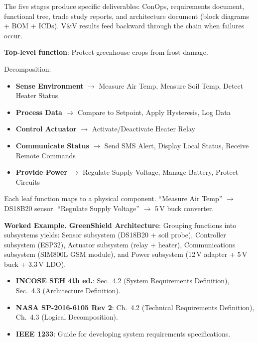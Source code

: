 The five stages produce specific deliverables: ConOps, requirements document, functional tree, trade study reports, and architecture document (block diagrams + BOM + ICDs). V\&V results feed backward through the chain when failures occur.


\begin{greenshieldbox}
\textbf{Top-level function}: Protect greenhouse crops from frost damage.

Decomposition:
\begin{itemize}[nosep,leftmargin=1.5em]
\item \textbf{Sense Environment} $\to$ Measure Air Temp, Measure Soil Temp, Detect Heater Status
\item \textbf{Process Data} $\to$ Compare to Setpoint, Apply Hysteresis, Log Data
\item \textbf{Control Actuator} $\to$ Activate/Deactivate Heater Relay
\item \textbf{Communicate Status} $\to$ Send SMS Alert, Display Local Status, Receive Remote Commands
\item \textbf{Provide Power} $\to$ Regulate Supply Voltage, Manage Battery, Protect Circuits
\end{itemize}
Each leaf function maps to a physical component. ``Measure Air Temp'' $\to$ DS18B20 sensor. ``Regulate Supply Voltage'' $\to$ 5\,V buck converter.

\textbf{Worked Example. GreenShield Architecture}: Grouping functions into subsystems yields: Sensor subsystem (DS18B20 + soil probe), Controller subsystem (ESP32), Actuator subsystem (relay + heater), Communications subsystem (SIM800L GSM module), and Power subsystem (12\,V adapter + 5\,V buck + 3.3\,V LDO).
\end{greenshieldbox}

\begin{keyconceptbox}
\begin{itemize}[nosep,leftmargin=1.5em]
\item \textbf{INCOSE SEH 4th ed.}: Sec.\ 4.2 (System Requirements Definition), Sec.\ 4.3 (Architecture Definition).
\item \textbf{NASA SP-2016-6105 Rev 2}: Ch.\ 4.2 (Technical Requirements Definition), Ch.\ 4.3 (Logical Decomposition).
\item \textbf{IEEE 1233}: Guide for developing system requirements specifications.
\end{itemize}
\end{keyconceptbox}

